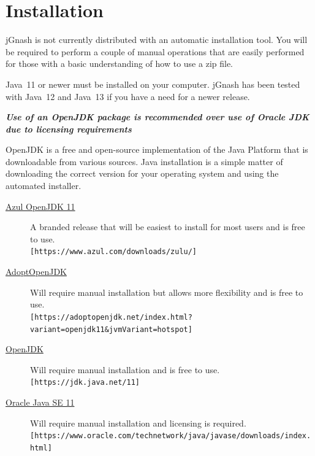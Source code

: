 \documentclass[letterpaper,12pt]{book}
\begin{document}
    \section{Installation}\label{sec:installation}
    jGnash is not currently distributed with an automatic installation tool.
    You will be required to perform a couple of manual operations that are easily performed for those with a basic
    understanding of how to use a zip file.
    
    Java\texttrademark~11 or newer must be installed on your computer. jGnash has been tested with Java\texttrademark~12
    and Java\texttrademark~13 if you have a need for a newer release.

    \textit{\textbf{Use of an OpenJDK package is recommended over use of Oracle JDK due to licensing requirements}}

    OpenJDK is a free and open-source implementation of the Java Platform that is downloadable from various sources.
    Java installation is a simple matter of downloading the correct version for your operating system and using the
    automated installer.

    \begin{description}
        \item[\href{https://www.azul.com/downloads/zulu/}{Azul OpenJDK 11}]
        A branded release that will be easiest to install for most users and is free to use. \\
        \texttt{[https://www.azul.com/downloads/zulu/]}
        \item[\href{https://adoptopenjdk.net/index.html?variant=openjdk11&jvmVariant=hotspot}{AdoptOpenJDK}]
        Will require manual installation but allows more flexibility and is free to use. \\
        \texttt{[https://adoptopenjdk.net/index.html?variant=openjdk11\&jvmVariant=hotspot]}
        \item [\href{https://jdk.java.net/11/}{OpenJDK}]
        Will require manual installation and is free to use. \\
        \texttt{[https://jdk.java.net/11]}
        \item[\href{https://www.oracle.com/technetwork/java/javase/downloads/index.html}{Oracle Java SE 11}]
        Will require manual installation and licensing is required. \\
        \texttt{[https://www.oracle.com/technetwork/java/javase/downloads/index.html]}
    \end{description}
\end{document}
